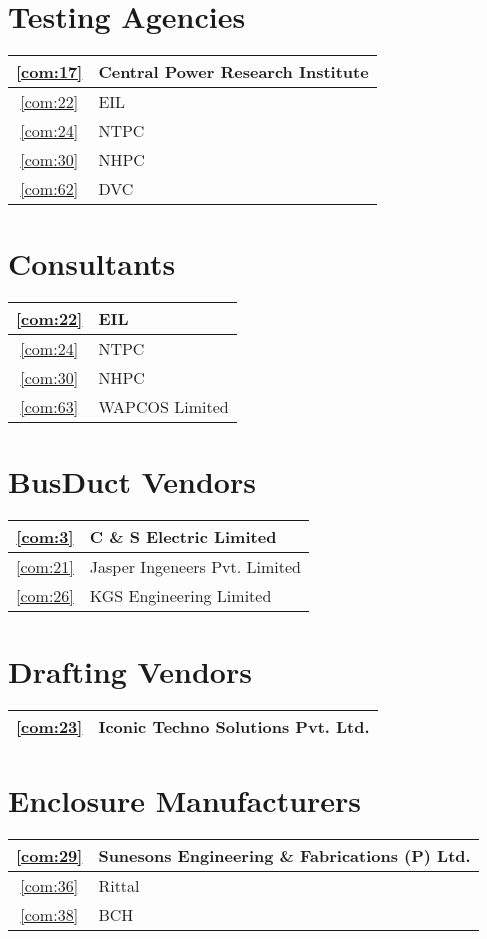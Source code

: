\documentclass[a4paper, 11pt, twoside]{book}
\begin{document}
\section{Testing Agencies}\label{cat:8}
\begin{tabular}{|c|l|}
\hline
\ref{com:17} & Central Power Research Institute \\ \hline
\ref{com:22} & EIL \\ \hline
\ref{com:24} & NTPC \\ \hline
\ref{com:30} & NHPC \\ \hline
\ref{com:62} & DVC \\ \hline
\end{tabular}
\section{Consultants}\label{cat:9}
\begin{tabular}{|c|l|}
\hline
\ref{com:22} & EIL \\ \hline
\ref{com:24} & NTPC \\ \hline
\ref{com:30} & NHPC \\ \hline
\ref{com:63} & WAPCOS Limited \\ \hline
\end{tabular}
\section{BusDuct Vendors}\label{cat:10}
\begin{tabular}{|c|l|}
\hline
\ref{com:3} & C \& S Electric Limited \\ \hline
\ref{com:21} & Jasper Ingeneers Pvt. Limited \\ \hline
\ref{com:26} & KGS Engineering Limited \\ \hline
\end{tabular}
\section{Drafting Vendors}\label{cat:11}
\begin{tabular}{|c|l|}
\hline
\ref{com:23} & Iconic Techno Solutions Pvt. Ltd. \\ \hline
\end{tabular}
\section{Enclosure Manufacturers}\label{cat:12}
\begin{tabular}{|c|l|}
\hline
\ref{com:29} & Sunesons Engineering \& Fabrications (P) Ltd. \\ \hline
\ref{com:36} & Rittal \\ \hline
\ref{com:38} & BCH \\ \hline
\end{tabular}
\end{document}
